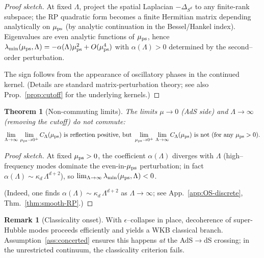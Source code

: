 \documentclass[10pt]{article}
\theoremstyle{definition}
\newtheorem{remark}{Remark}[section]
\theoremstyle{plain}
\newtheorem{theorem}{Theorem}[section]
\begin{document}
\begin{proof}[Proof sketch]
At fixed $\Lambda$, project the spatial Laplacian $-\Delta_{S^d}$ to any finite-rank subspace; the RP quadratic form
becomes a finite Hermitian matrix depending analytically on $\mu_{\rm ps}$ (by analytic continuation in the Bessel/Hankel
index). Eigenvalues are even analytic functions of $\mu_{\rm ps}$, hence $\lambda_{\min}(\mu_{\rm ps},\Lambda)
= -\alpha(\Lambda)\mu_{\rm ps}^2+O(\mu_{\rm ps}^4)$ with $\alpha(\Lambda)>0$ determined by the second–order perturbation.

The sign follows from the appearance of oscillatory phases in the continued kernel. (Details are standard matrix-perturbation theory; see also Prop.~\ref{prop:cutoff} for the underlying kernels.)
\end{proof}

\begin{theorem}[Non-commuting limits]
\label{thm:limits}
The limits $\mu\to 0$ (AdS side) and $\Lambda\to\infty$ (removing the cutoff) do not commute:
\begin{equation}
\lim_{\Lambda\to\infty}\,\lim_{\mu_{\rm ps}\to 0^+} C_\Lambda(\mu_{\rm ps}) \ \text{is reflection positive, but}\ 
\lim_{\mu_{\rm ps}\to 0^+}\,\lim_{\Lambda\to\infty} C_\Lambda(\mu_{\rm ps})\ \text{is not (for any }\mu_{\rm ps}>0).
\end{equation}
\end{theorem}

\begin{proof}[Proof sketch]
At fixed $\mu_{\rm ps}>0$, the coefficient $\alpha(\Lambda)$ diverges with $\Lambda$ (high–frequency modes dominate
the even-in-$\mu_{\rm ps}$ perturbation; in fact $\alpha(\Lambda)\sim \kappa_d\,\Lambda^{d+2}$), so
$\lim_{\Lambda\to\infty}\lambda_{\min}(\mu_{\rm ps},\Lambda)<0$.

(Indeed, one finds $\alpha(\Lambda)\sim \kappa_d\,\Lambda^{d+2}$ as $\Lambda\to\infty$; see App.~\ref{app:OS-discrete}, Thm.~\ref{thm:smooth-RP}.)

\end{proof}

\begin{remark}[Classicality onset]
\label{rem:uom-main-001}
With $\epsilon$--collapse in place, decoherence of super-Hubble modes proceeds efficiently and yields a WKB classical branch. Assumption~\ref{ass:concerted} ensures this happens \emph{at} the AdS$\to$dS crossing; in the unrestricted continuum, the classicality criterion fails.
\end{remark}
\end{document}
